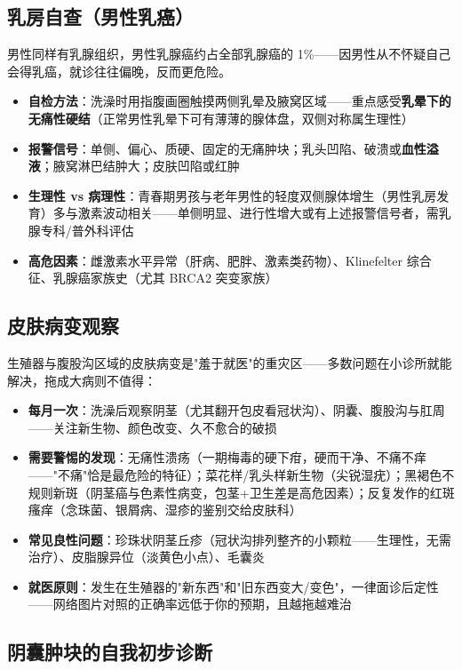 \documentclass[12pt,a4paper,twoside]{ctexbook}
\begin{document}
\subsection{乳房自查（男性乳癌）}


男性同样有乳腺组织，男性乳腺癌约占全部乳腺癌的 1\%——因男性从不怀疑自己会得乳癌，就诊往往偏晚，反而更危险。

\begin{itemize}
	\item \textbf{自检方法}：洗澡时用指腹画圈触摸两侧乳晕及腋窝区域——重点感受\textbf{乳晕下的无痛性硬结}（正常男性乳晕下可有薄薄的腺体盘，双侧对称属生理性）
	\item \textbf{报警信号}：单侧、偏心、质硬、固定的无痛肿块；乳头凹陷、破溃或\textbf{血性溢液}；腋窝淋巴结肿大；皮肤凹陷或红肿
	\item \textbf{生理性 vs 病理性}：青春期男孩与老年男性的轻度双侧腺体增生（男性乳房发育）多与激素波动相关——单侧明显、进行性增大或有上述报警信号者，需乳腺专科/普外科评估
	\item \textbf{高危因素}：雌激素水平异常（肝病、肥胖、激素类药物）、Klinefelter 综合征、乳腺癌家族史（尤其 BRCA2 突变家族）
\end{itemize}

\subsection{皮肤病变观察}


生殖器与腹股沟区域的皮肤病变是"羞于就医"的重灾区——多数问题在小诊所就能解决，拖成大病则不值得：

\begin{itemize}
	\item \textbf{每月一次}：洗澡后观察阴茎（尤其翻开包皮看冠状沟）、阴囊、腹股沟与肛周——关注新生物、颜色改变、久不愈合的破损
	\item \textbf{需要警惕的发现}：无痛性溃疡（一期梅毒的硬下疳，硬而干净、不痛不痒——"不痛"恰是最危险的特征）；菜花样/乳头样新生物（尖锐湿疣）；黑褐色不规则新斑（阴茎癌与色素性病变，包茎+卫生差是高危因素）；反复发作的红斑瘙痒（念珠菌、银屑病、湿疹的鉴别交给皮肤科）
	\item \textbf{常见良性问题}：珍珠状阴茎丘疹（冠状沟排列整齐的小颗粒——生理性，无需治疗）、皮脂腺异位（淡黄色小点）、毛囊炎
	\item \textbf{就医原则}：发生在生殖器的"新东西"和"旧东西变大/变色"，一律面诊后定性——网络图片对照的正确率远低于你的预期，且越拖越难治
\end{itemize}

\subsection{阴囊肿块的自我初步诊断}
\end{document}
